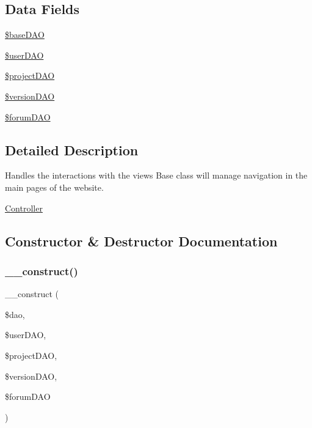 \subsection*{Data Fields}
\begin{DoxyCompactItemize}
\item 
\hyperlink{class_controller_a5201c1dfa1e73dd3ab719f657d2ee5b2}{\$base\+D\+AO}
\item 
\hyperlink{class_controller_a3d5f01d1592f9012027dd8cd49d8d029}{\$user\+D\+AO}
\item 
\hyperlink{class_controller_ac474a3665e60e3c2537876c94a926cfc}{\$project\+D\+AO}
\item 
\hyperlink{class_controller_a41947b974852ee198f45b4bb44fd6e22}{\$version\+D\+AO}
\item 
\hyperlink{class_controller_a492628b7bd1dcf872ab19c2bbb0af7d6}{\$forum\+D\+AO}
\end{DoxyCompactItemize}


\subsection{Detailed Description}
Handles the interactions with the views Base class will manage navigation in the main pages of the website. 

\hyperlink{class_controller}{Controller} 

\subsection{Constructor \& Destructor Documentation}
\mbox{\label{class_controller_a1dd81c9e2ac2fc2ca00acd06ce8a86e9}} 
\subsubsection{\texorpdfstring{\+\_\+\+\_\+construct()}{\_\_construct()}}
{\footnotesize\ttfamily \+\_\+\+\_\+construct (\begin{DoxyParamCaption}\item[{}]{\$dao,  }\item[{}]{\$user\+D\+AO,  }\item[{}]{\$project\+D\+AO,  }\item[{}]{\$version\+D\+AO,  }\item[{}]{\$forum\+D\+AO }\end{DoxyParamCaption})}



